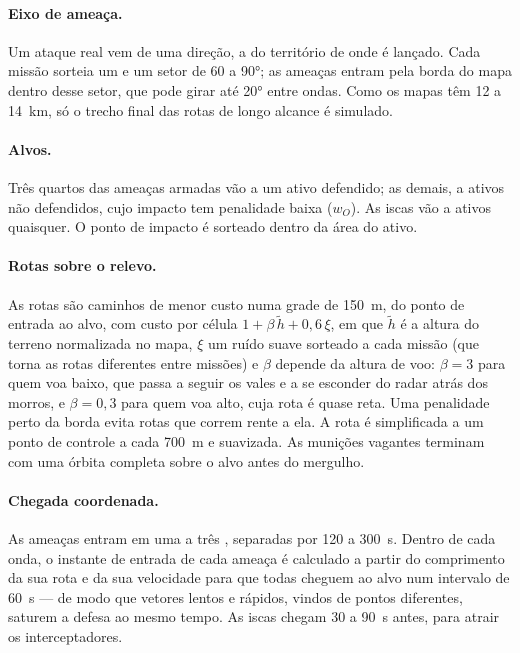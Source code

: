 \paragraph{Eixo de ameaça.} Um ataque real vem de uma direção, a do território de onde é lançado. Cada missão sorteia um
 e um setor de 60 a 90°; as ameaças entram pela borda do mapa dentro desse setor, que pode girar
até 20° entre ondas. Como os mapas têm 12 a 14~km, só o trecho final das rotas de longo alcance é simulado.

\paragraph{Alvos.} Três quartos das ameaças armadas vão a um ativo defendido; as demais, a ativos não defendidos, cujo
impacto tem penalidade baixa ($w_O$). As iscas vão a ativos quaisquer. O ponto de impacto é sorteado dentro da área do
ativo.

\paragraph{Rotas sobre o relevo.} As rotas são caminhos de menor custo numa grade de 150~m, do ponto de entrada ao alvo,
com custo por célula $1+\beta\,\tilde h+0{,}6\,\xi$, em que $\tilde h$ é a altura do terreno normalizada no mapa, $\xi$
um ruído suave sorteado a cada missão (que torna as rotas diferentes entre missões) e $\beta$ depende da altura de voo:
$\beta=3$ para quem voa baixo, que passa a seguir os vales e a se esconder do radar atrás dos morros, e $\beta=0{,}3$
para quem voa alto, cuja rota é quase reta. Uma penalidade perto da borda evita rotas que correm rente a ela. A rota é
simplificada a um ponto de controle a cada 700~m e suavizada. As munições vagantes terminam com uma órbita completa
sobre o alvo antes do mergulho.

\paragraph{Chegada coordenada.} As ameaças entram em uma a três , separadas por 120 a 300~s. Dentro de
cada onda, o instante de entrada de cada ameaça é calculado a partir do comprimento da sua rota e da sua velocidade
para que todas cheguem ao alvo num intervalo de 60~s --- de modo que vetores lentos e rápidos, vindos de pontos
diferentes, saturem a defesa ao mesmo tempo. As iscas chegam 30 a 90~s antes, para atrair os interceptadores.

